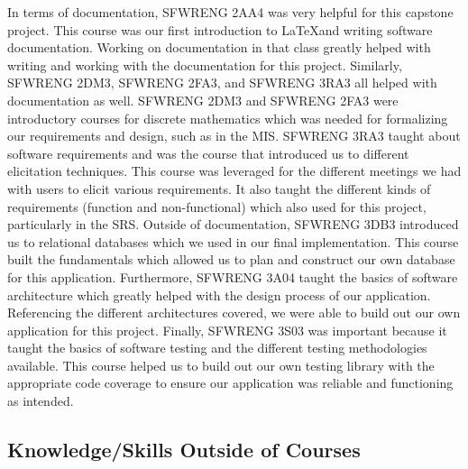 \documentclass{article}
\begin{document}
In terms of documentation, SFWRENG 2AA4 was very helpful for this capstone project. This course was our first
introduction to \LaTeX and writing software documentation. Working on documentation in that class greatly helped
with writing and working with the documentation for this project. Similarly, SFWRENG 2DM3, SFWRENG 2FA3, and SFWRENG 3RA3
all helped with documentation as well. SFWRENG 2DM3 and SFWRENG 2FA3 were introductory courses for discrete mathematics
which was needed for formalizing our requirements and design, such as in the MIS. SFWRENG 3RA3 taught about software requirements and was the course
that introduced us to different elicitation techniques. This course was leveraged for the different meetings we had with users to elicit
various requirements. It also taught the different kinds of requirements (function and non-functional) which also used for this project, particularly
in the SRS. Outside of documentation, SFWRENG 3DB3 introduced us to relational databases which we used in our final
implementation. This course built the fundamentals which allowed us to plan and construct our own database for this application.
Furthermore, SFWRENG 3A04 taught the basics of software architecture which greatly helped with the design process of our
application. Referencing the different architectures covered, we were able to build out our own application for this project. Finally,
SFWRENG 3S03 was important because it taught the basics of software testing and the different testing methodologies available. This
course helped us to build out our own testing library with the appropriate code coverage to ensure our application was reliable
and functioning as intended.

\subsection{Knowledge/Skills Outside of Courses}

\end{document}
